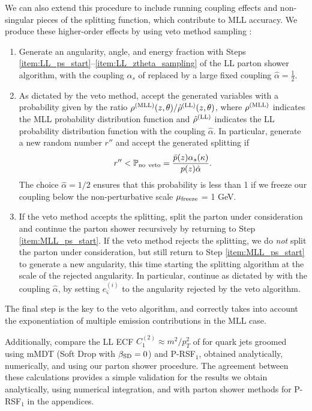 We can also extend this procedure to include running coupling effects and non-singular pieces of the splitting function, which contribute to MLL accuracy.
%
We produce these higher-order effects by using veto method sampling \cite{Sjostrand:2007gs,Larkoski:2013paa,Sjostrand:2014zea}:
%
\begin{enumerate}
	\item
	\label{item:MLL_ps_start}
	Generate an angularity, angle, and energy fraction with Steps \ref{item:LL_ps_start}--\ref{item:LL_ztheta_sampling} of the LL parton shower algorithm, with the coupling \(\alpha_s\) of  replaced by a large fixed coupling \(\hat\alpha = \frac{1}{2}\).

	\item
	As dictated by the veto method, accept the generated variables with a probability given by the ratio \(\rho^{\rm(MLL)}(z,\theta)/\hat\rho^{\rm(LL)}(z,\theta)\), where \(\rho^{\rm(MLL)}\) indicates the MLL probability distribution function and \(\hat\rho^{\rm(LL)}\) indicates the LL probability distribution function with the coupling \(\hat\alpha\).
	In particular, generate a new random number \(r''\) and accept the generated splitting if
	\begin{align}
	    r'' < \mathbb{P}_{\rm no~veto} = \frac{\bar{p}(z)\alpha_s(\kappa)}{p(z)\hat\alpha}
	    .
	\end{align}
    The choice \(\hat \alpha = 1/2\) ensures that this probability is less than 1 if we freeze our coupling below the non-perturbative scale \(\mu_{\rm freeze}\) = 1 GeV.

	\item
	If the veto method accepts the splitting, split the parton under consideration and continue the parton shower recursively by returning to Step \ref{item:MLL_ps_start}.
	If the veto method rejects the splitting, we do \textit{not} split the parton under consideration, but still return to Step \ref{item:MLL_ps_start} to generate a new angularity, this time starting the splitting algorithm at the scale of the rejected angularity.
	In particular, continue as dictated by  with the coupling \(\hat\alpha\), by setting \(e_\varsigma^{(i)}\) to the angularity rejected by the veto algorithm.
\end{enumerate}
%
The final step is the key to the veto algorithm, and correctly takes into account the exponentiation of multiple emission contributions in the MLL case.

Additionally,  compare the LL ECF \(C_1^{(2)} \approx m^2 / p_T^2\) of  for quark jets groomed using mMDT (Soft Drop with \(\beta_{\rm SD} = 0\)) and P-RSF\(_1\), obtained analytically, numerically, and using our parton shower procedure.
%
The agreement between these calculations provides a simple validation for the results we obtain analytically, using numerical integration, and with parton shower methods for P-RSF\(_1\) in the appendices.






